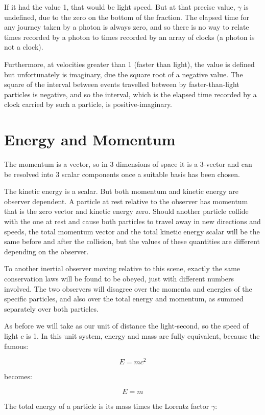 If it had the value 1, that would be light speed. But at that precise value, $\gamma$ is undefined, due to the zero on the bottom of the fraction. The elapsed time for any journey taken by a photon is always zero, and so there is no way to relate times recorded by a photon to times recorded by an array of clocks (a photon is not a clock).

Furthermore, at velocities greater than 1 (faster than light), the value is defined but unfortunately is imaginary, due the square root of a negative value. The square of the interval between events travelled between by faster-than-light particles is negative, and so the interval, which is the elapsed time recorded by a clock carried by such a particle, is positive-imaginary.

\section{Energy and Momentum}

The momentum is a vector, so in 3 dimensions of space it is a 3-vector and can be resolved into 3 scalar components once a suitable basis has been chosen.

The kinetic energy is a scalar. But both momentum and kinetic energy are observer dependent. A particle at rest relative to the observer has momentum that is the zero vector and kinetic energy zero. Should another particle collide with the one at rest and cause both particles to travel away in new directions and speeds, the total momentum vector and the total kinetic energy scalar will be the same before and after the collision, but the values of these quantities are different depending on the observer.

To another inertial observer moving relative to this scene, exactly the same conservation laws will be found to be obeyed, just with different numbers involved. The two observers will disagree over the momenta and energies of the specific particles, and also over the total energy and momentum, as summed separately over both particles.

As before we will take as our unit of distance the light-second, so the speed of light $c$ is 1. In this unit system, energy and mass are fully equivalent, because the famous:

$$E = mc^2$$

becomes:

$$E = m$$

The total energy of a particle is its mass times the Lorentz factor $\gamma$:

